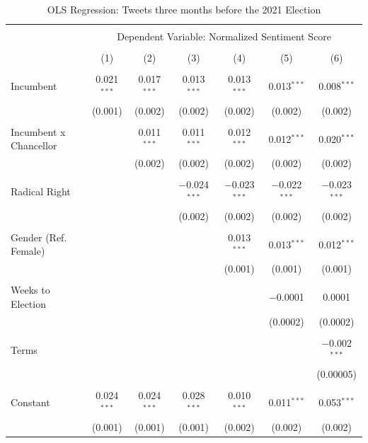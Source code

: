 \documentclass[a4paper,11pt]{article}
\begin{document}
\begin{table}[H]
    \centering
    \caption{OLS Regression: Tweets three months before the 2021 Election}
    \label{tab:regcampaign}
\begingroup 
\scriptsize 
\begin{tabular}{@{\extracolsep{5pt}}lcccccc} 
\\[-1.8ex]\hline 
\hline \\[-1.8ex] 
 & \multicolumn{6}{c}{Dependent Variable: Normalized Sentiment Score} \\ 
\cline{2-7} 
\\[-1.8ex] & (1) & (2) & (3) & (4) & (5) & (6)\\ 
\hline \\[-1.8ex] 
 Incumbent & 0.021$^{***}$ & 0.017$^{***}$ & 0.013$^{***}$ & 0.013$^{***}$ & 0.013$^{***}$ & 0.008$^{***}$ \\ 
  & (0.001) & (0.002) & (0.002) & (0.002) & (0.002) & (0.002) \\ 
  & & & & & & \\ 
 Incumbent x Chancellor &  & 0.011$^{***}$ & 0.011$^{***}$ & 0.012$^{***}$ & 0.012$^{***}$ & 0.020$^{***}$ \\ 
  &  & (0.002) & (0.002) & (0.002) & (0.002) & (0.002) \\ 
  & & & & & & \\ 
 Radical Right &  &  & $-$0.024$^{***}$ & $-$0.023$^{***}$ & $-$0.022$^{***}$ & $-$0.023$^{***}$ \\ 
  &  &  & (0.002) & (0.002) & (0.002) & (0.002) \\ 
  & & & & & & \\ 
 Gender (Ref. Female) &  &  &  & 0.013$^{***}$ & 0.013$^{***}$ & 0.012$^{***}$ \\ 
  &  &  &  & (0.001) & (0.001) & (0.001) \\ 
  & & & & & & \\ 
 Weeks to Election &  &  &  &  & $-$0.0001 & 0.0001 \\ 
  &  &  &  &  & (0.0002) & (0.0002) \\ 
  & & & & & & \\ 
 Terms &  &  &  &  &  & $-$0.002$^{***}$ \\ 
  &  &  &  &  &  & (0.00005) \\ 
  & & & & & & \\ 
 Constant & 0.024$^{***}$ & 0.024$^{***}$ & 0.028$^{***}$ & 0.010$^{***}$ & 0.011$^{***}$ & 0.053$^{***}$ \\ 
  & (0.001) & (0.001) & (0.001) & (0.002) & (0.002) & (0.002) \\ 

\end{tabular}
\end{table}
\end{document}
